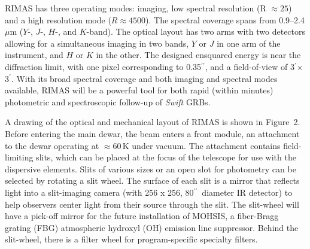 \documentclass[letterpaper,11pt]{article}
\newcommand{\arcsec}{\mbox{$^{\prime\prime}$}}%
\newcommand{\arcmin}{\mbox{$^\prime$}}%
\begin{document}
RIMAS has three operating modes: imaging, low spectral resolution (R $\approx 25$) and
a high resolution mode ($R \approx 4500$). The spectral coverage spans from 
0.9--2.4\,$\mu$m ($Y$-, $J$-, $H$-, and $K$-band).  The optical layout has two arms 
with two detectors allowing for a simultaneous imaging in two bands, $Y$ or $J$ in 
one arm of the instrument, and $H$ or $K$ in the other.  The designed ensquared
energy is near the diffraction limit, with one pixel corresponding to 0.35\arcsec, 
and a field-of-view of 3\arcmin $\times$ 3\arcmin.  With its broad spectral coverage 
and both imaging and spectral modes available, RIMAS will be a powerful tool for 
both rapid (within minutes) photometric and spectroscopic follow-up of \textit{Swift} GRBs.

\smallskip

A drawing of the optical and mechanical layout of RIMAS is shown in Figure~2.
Before entering the main dewar, the beam enters a front module, an attachment to the 
dewar operating at $\approx 60$\,K under vacuum. The attachment contains field-limiting 
slits, which can be placed at the focus of the telescope for use with the 
dispersive elements. Slits of various sizes or an open slot for photometry can be selected by 
rotating a slit wheel. The surface of each slit is a mirror that reflects light into a slit-imaging 
camera (with 256 x 256, 80\arcsec\ diameter IR detector) to help observers center light from 
their source through the slit.  The slit-wheel will have a pick-off mirror for the future 
installation of MOHSIS, a fiber-Bragg grating (FBG) atmospheric hydroxyl (OH) emission 
line suppressor. Behind the slit-wheel, there is a  filter wheel for program-specific specialty filters. 
\end{document}
